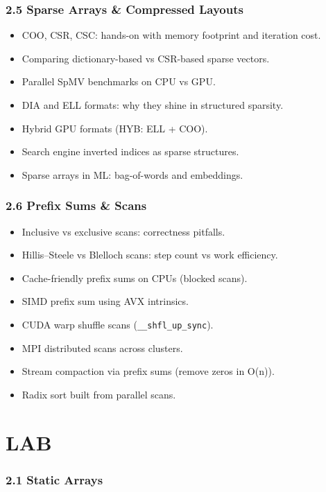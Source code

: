 \documentclass[
  letterpaper,
  DIV=11,
  numbers=noendperiod]{scrreprt}
\providecommand{\tightlist}{%
  \setlength{\itemsep}{0pt}\setlength{\parskip}{0pt}}
\begin{document}
\subsubsection{2.5 Sparse Arrays \& Compressed
Layouts}\label{sparse-arrays-compressed-layouts}

\begin{itemize}
\tightlist
\item
  COO, CSR, CSC: hands-on with memory footprint and iteration cost.
\item
  Comparing dictionary-based vs CSR-based sparse vectors.
\item
  Parallel SpMV benchmarks on CPU vs GPU.
\item
  DIA and ELL formats: why they shine in structured sparsity.
\item
  Hybrid GPU formats (HYB: ELL + COO).
\item
  Search engine inverted indices as sparse structures.
\item
  Sparse arrays in ML: bag-of-words and embeddings.
\end{itemize}

\subsubsection{2.6 Prefix Sums \& Scans}\label{prefix-sums-scans-1}

\begin{itemize}
\tightlist
\item
  Inclusive vs exclusive scans: correctness pitfalls.
\item
  Hillis--Steele vs Blelloch scans: step count vs work efficiency.
\item
  Cache-friendly prefix sums on CPUs (blocked scans).
\item
  SIMD prefix sum using AVX intrinsics.
\item
  CUDA warp shuffle scans (\texttt{\_\_shfl\_up\_sync}).
\item
  MPI distributed scans across clusters.
\item
  Stream compaction via prefix sums (remove zeros in O(n)).
\item
  Radix sort built from parallel scans.
\end{itemize}

\section{LAB}\label{lab}

\subsubsection{2.1 Static Arrays}\label{static-arrays-2}
\end{document}
